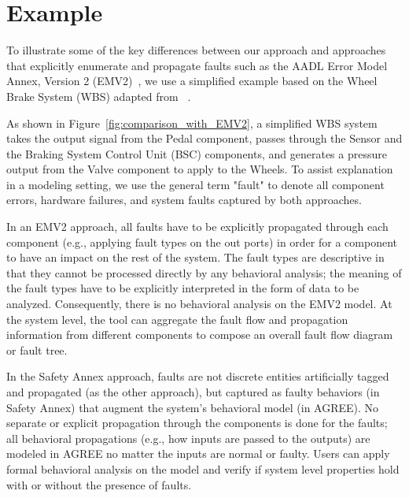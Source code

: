 \section{Example}
\label{sec:comparison_with_EMV2}

To illustrate some of the key differences between our approach and approaches that explicitly enumerate and propagate faults such as the AADL Error Model Annex, Version 2 (EMV2)~\cite{EMV2}, we use a simplified example based on the Wheel Brake System (WBS) adapted from ~\cite{WBS_EMV2_Example}.

As shown in Figure~\ref{fig:comparison_with_EMV2}, a simplified WBS system takes the output signal from the Pedal component, passes through the Sensor and the Braking System Control Unit (BSC) components, and generates a pressure output from the Valve component to apply to the Wheels. To assist explanation in a modeling setting, we use the general term "fault" to denote all component errors, hardware failures, and system faults captured by both approaches.

In an EMV2 approach, all faults have to be explicitly propagated through each component (e.g., applying fault types on the out ports) in order for a component to have an impact on the rest of the system. The fault types are descriptive in that they cannot be processed directly by any behavioral analysis; the meaning of the fault types have to be explicitly interpreted in the form of data to be analyzed. Consequently, there is no behavioral analysis on the EMV2 model. At the system level, the tool can aggregate the fault flow and propagation information from different components to compose an overall fault flow diagram or fault tree.

In the Safety Annex approach, faults are not discrete entities artificially tagged and propagated (as the other approach), but captured as faulty behaviors (in Safety Annex) that augment the system's behavioral model (in AGREE). No separate or explicit propagation through the components is done for the faults; all behavioral propagations (e.g., how inputs are passed to the outputs) are modeled in AGREE no matter the inputs are normal or faulty. Users can apply formal behavioral analysis on the model and verify if system level properties hold with or without the presence of faults.

